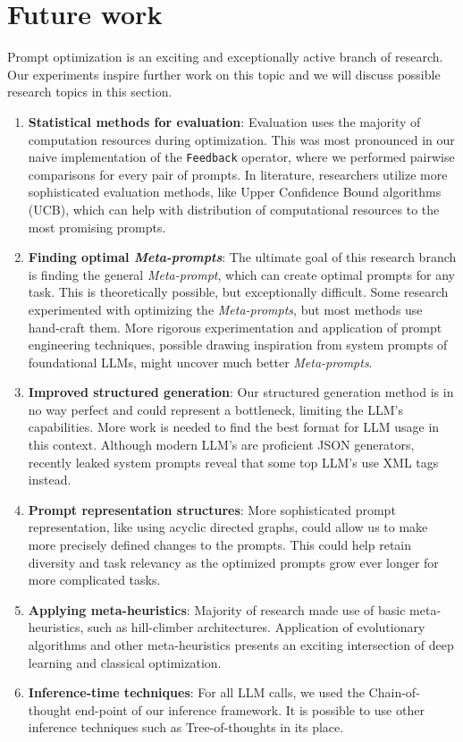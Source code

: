\section{Future work}
Prompt optimization is an exciting and exceptionally active branch of research. 
Our experiments inspire further work on this topic and we will discuss possible research topics in this section.
\begin{enumerate}
    \item \textbf{Statistical methods for evaluation}: Evaluation uses the majority of computation resources during optimization. This was most pronounced in our naive implementation of the \texttt{Feedback} operator, where we performed pairwise comparisons for every pair of prompts. In literature\cite{pryzant2023automaticpromptoptimizationgradient}\cite{zhang2024sprigimprovinglargelanguage}, researchers utilize more sophisticated evaluation methods, like Upper Confidence Bound algorithms (UCB), which can help with distribution of computational resources to the most promising prompts.
    \item \textbf{Finding optimal \textit{Meta-prompts}}: The ultimate goal of this research branch is finding the general \textit{Meta-prompt}, which can create optimal prompts for any task. This is theoretically possible\cite{dewynter2024metaprompting}, but exceptionally difficult. Some research\cite{fernando2023promptbreederselfreferentialselfimprovementprompt} experimented with optimizing the \textit{Meta-prompts}, but most methods use hand-craft them. More rigorous experimentation and application of prompt engineering techniques, possible drawing inspiration from system prompts of foundational LLMs, might uncover much better \textit{Meta-prompts}.
    \item \textbf{Improved structured generation}: Our structured generation method is in no way perfect and could represent a bottleneck, limiting the LLM's capabilities. More work is needed to find the best format for LLM usage in this context. Although modern LLM's are proficient JSON generators, recently leaked system prompts reveal that some top LLM's use XML tags instead. 
    \item \textbf{Prompt representation structures}: More sophisticated prompt representation, like using acyclic directed graphs\cite{zhang2024sprigimprovinglargelanguage}, could allow us to make more precisely defined changes to the prompts. This could help retain diversity and task relevancy as the optimized prompts grow ever longer for more complicated tasks.
    \item \textbf{Applying meta-heuristics}: Majority of research made use of basic meta-heuristics, such as hill-climber architectures. Application of evolutionary algorithms\cite{guo2024connectinglargelanguagemodels} and other meta-heuristics\cite{pan2024plumpromptlearningusing} presents an exciting intersection of deep learning and classical optimization.
    \item \textbf{Inference-time techniques}: For all LLM calls, we used the Chain-of-thought end-point of our inference framework. It is possible to use other inference techniques such as Tree-of-thoughts in its place.
\end{enumerate}

